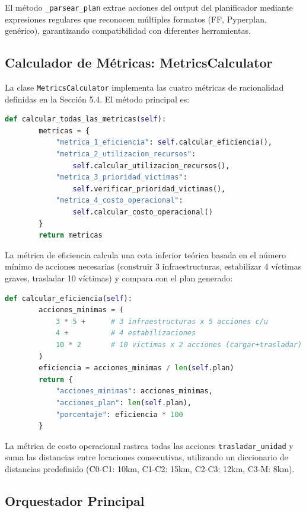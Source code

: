 \documentclass[conference]{IEEEtran}
\begin{document}
    El método \texttt{\_parsear\_plan} extrae acciones del output del planificador mediante expresiones regulares que reconocen múltiples formatos (FF, Pyperplan, genérico), garantizando compatibilidad con diferentes herramientas.

    \subsection{Calculador de Métricas: MetricsCalculator}

    La clase \texttt{MetricsCalculator} implementa las cuatro métricas de racionalidad definidas en la Sección 5.4. El método principal es:

    \begin{lstlisting}[language=Python]
    def calcular_todas_las_metricas(self):
        metricas = {
            "metrica_1_eficiencia": self.calcular_eficiencia(),
            "metrica_2_utilizacion_recursos": 
                self.calcular_utilizacion_recursos(),
            "metrica_3_prioridad_victimas": 
                self.verificar_prioridad_victimas(),
            "metrica_4_costo_operacional": 
                self.calcular_costo_operacional()
        }
        return metricas
    \end{lstlisting}

    La métrica de eficiencia calcula una cota inferior teórica basada en el número mínimo de acciones necesarias (construir 3 infraestructuras, estabilizar 4 víctimas graves, trasladar 10 víctimas) y compara con el plan generado:

    \begin{lstlisting}[language=Python]
    def calcular_eficiencia(self):
        acciones_minimas = (
            3 * 5 +      # 3 infraestructuras x 5 acciones c/u
            4 +          # 4 estabilizaciones
            10 * 2       # 10 victimas x 2 acciones (cargar+trasladar)
        )
        eficiencia = acciones_minimas / len(self.plan)
        return {
            "acciones_minimas": acciones_minimas,
            "acciones_plan": len(self.plan),
            "porcentaje": eficiencia * 100
        }
    \end{lstlisting}

    La métrica de costo operacional rastrea todas las acciones \texttt{trasladar\_unidad} y suma las distancias entre locaciones consecutivas, utilizando un diccionario de distancias predefinido (C0-C1: 10km, C1-C2: 15km, C2-C3: 12km, C3-M: 8km).

    \subsection{Orquestador Principal}
\end{document}

